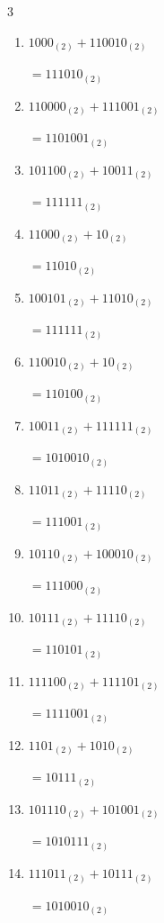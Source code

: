 \begin{multicols}{3}
\begin{enumerate}
  \item $1000_{(2)} + 110010_{(2)}$

        $=111010_{(2)}$

  \item $110000_{(2)} + 111001_{(2)}$

        $=1101001_{(2)}$

  \item $101100_{(2)} + 10011_{(2)}$

        $=111111_{(2)}$

  \item $11000_{(2)} + 10_{(2)}$

        $=11010_{(2)}$

  \item $100101_{(2)} + 11010_{(2)}$

        $=111111_{(2)}$

  \item $110010_{(2)} + 10_{(2)}$

        $=110100_{(2)}$

  \item $10011_{(2)} + 111111_{(2)}$

        $=1010010_{(2)}$

  \item $11011_{(2)} + 11110_{(2)}$

        $=111001_{(2)}$

  \item $10110_{(2)} + 100010_{(2)}$

        $=111000_{(2)}$

\columnbreak %

  \item $10111_{(2)} + 11110_{(2)}$

        $=110101_{(2)}$

  \item $111100_{(2)} + 111101_{(2)}$

        $=1111001_{(2)}$

  \item $1101_{(2)} + 1010_{(2)}$

        $=10111_{(2)}$

  \item $101110_{(2)} + 101001_{(2)}$

        $=1010111_{(2)}$

  \item $111011_{(2)} + 10111_{(2)}$

        $=1010010_{(2)}$


\end{enumerate}
\end{multicols}

